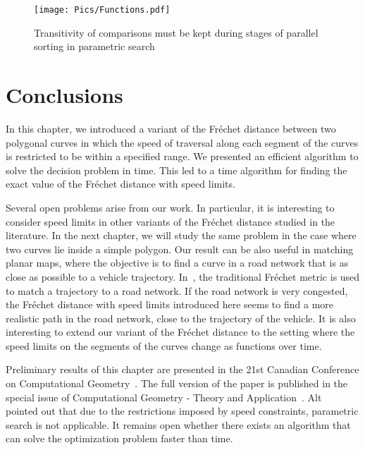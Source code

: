 \documentclass[12pt]{dalthesis}
\newcommand{\REM}[1]{}
\newcommand{\Frechet}{Fr\'echet }
\begin{document}
\REM{
The total preprocessing time must be less than  for all 
the vertices of .
If the above sub-problem can be solved in 
 time,  to compute ,
one can use the randomized approach in \cite{HarPeled11}
to achieve an algorithm with expected running time less than .
}

\begin{figure}[t]
	\centering
	\texttt{[image: Pics/Functions.pdf]}  
	\caption{Transitivity of comparisons must be kept during stages of parallel sorting in parametric search}
	\label{fig:PSproblem}
\end{figure}




\section{Conclusions} \label{sec:conclusion}

In this chapter, we introduced a variant of the \Frechet distance between two polygonal curves
in which the speed of traversal along each segment of the curves is restricted to be within a specified range.
We presented an efficient algorithm to solve the decision problem
in  time.
This led to a  time algorithm for finding 
the exact value of the \Frechet distance with speed limits.



Several open problems arise from our work.
In particular, it is interesting to consider 
speed limits in
other variants of the \Frechet distance studied in the literature. In the next chapter, we will study the
same problem  in the case where 
two curves lie inside a simple polygon.
Our result can be also useful 
in matching planar maps, where the objective is 
to find a curve in a road network that is as close as possible to a vehicle trajectory. 
In~\cite{AltERW03a}, the traditional \Frechet metric is used to match 
a trajectory to a road network. 
If the road network is very congested,  
the \Frechet distance with speed limits introduced here seems to find a more realistic path in the road network, 
close to the trajectory of the vehicle.
It is also interesting to extend our variant of the \Frechet distance 
to the setting where the speed limits on the segments of the curves change as functions over time.



Preliminary results of this chapter 
are presented in the 21st Canadian Conference on 
Computational Geometry~\cite{oursCCCG2009}. 
The full version of the paper is published in 
the special issue of Computational Geometry - Theory and Application~\cite{oursSpeedJournal}.
Alt~\cite{AltFinal} pointed out 
that due to the restrictions imposed by speed constraints, 
parametric search is not applicable.
It remains open whether there exists an algorithm 
that can solve the optimization 
problem faster than  time.
\clearpage{}
\end{document}
